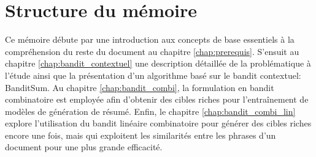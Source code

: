 \section*{Structure du mémoire}

Ce mémoire débute par une introduction aux concepts de base essentiels à la compréhension
du reste du document au chapitre \ref{chap:prerequis}.
S'ensuit au chapitre \ref{chap:bandit_contextuel} une description détaillée 
de la problématique à l'étude ainsi que la présentation d'un algorithme 
basé sur le bandit contextuel: BanditSum.
Au chapitre \ref{chap:bandit_combi}, la formulation en bandit combinatoire est employée
afin d'obtenir des cibles riches pour l'entraînement de modèles de génération de résumé.
Enfin, le chapitre \ref{chap:bandit_combi_lin} explore l'utilisation du bandit linéaire 
combinatoire pour générer des cibles riches encore une fois, mais qui exploitent les similarités 
entre les phrases d'un document pour une plus grande efficacité.